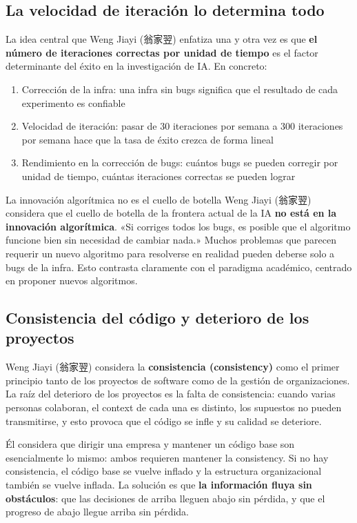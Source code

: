 \documentclass[a4paper]{article}
\begin{document}
\subsection{La velocidad de iteración lo determina todo}

La idea central que Weng Jiayi (翁家翌) enfatiza una y otra vez es que \textbf{el número de iteraciones correctas por unidad de tiempo} es el factor determinante del éxito en la investigación de IA. En concreto:

\begin{enumerate}
    \item Corrección de la infra: una infra sin bugs significa que el resultado de cada experimento es confiable
    \item Velocidad de iteración: pasar de 30 iteraciones por semana a 300 iteraciones por semana hace que la tasa de éxito crezca de forma lineal
    \item Rendimiento en la corrección de bugs: cuántos bugs se pueden corregir por unidad de tiempo, cuántas iteraciones correctas se pueden lograr
\end{enumerate}

\begin{warningbox}{La innovación algorítmica no es el cuello de botella}
Weng Jiayi (翁家翌) considera que el cuello de botella de la frontera actual de la IA \textbf{no está en la innovación algorítmica}. «Si corriges todos los bugs, es posible que el algoritmo funcione bien sin necesidad de cambiar nada.» Muchos problemas que parecen requerir un nuevo algoritmo para resolverse en realidad pueden deberse solo a bugs de la infra. Esto contrasta claramente con el paradigma académico, centrado en proponer nuevos algoritmos.
\end{warningbox}

\subsection{Consistencia del código y deterioro de los proyectos}

Weng Jiayi (翁家翌) considera la \textbf{consistencia (consistency)} como el primer principio tanto de los proyectos de software como de la gestión de organizaciones. La raíz del deterioro de los proyectos es la falta de consistencia: cuando varias personas colaboran, el context de cada una es distinto, los supuestos no pueden transmitirse, y esto provoca que el código se infle y su calidad se deteriore.

Él considera que dirigir una empresa y mantener un código base son esencialmente lo mismo: ambos requieren mantener la consistency. Si no hay consistencia, el código base se vuelve inflado y la estructura organizacional también se vuelve inflada. La solución es que \textbf{la información fluya sin obstáculos}: que las decisiones de arriba lleguen abajo sin pérdida, y que el progreso de abajo llegue arriba sin pérdida.
\end{document}
